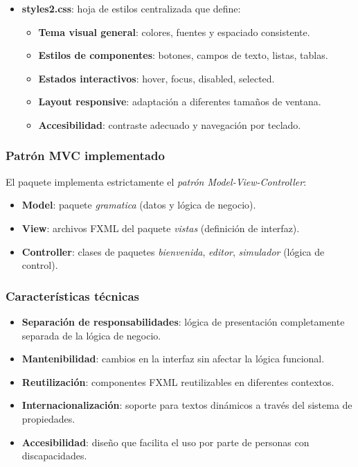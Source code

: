 \begin{itemize}
    \item \textbf{styles2.css}: hoja de estilos centralizada que define:
    \begin{itemize}
        \item \textbf{Tema visual general}: colores, fuentes y espaciado consistente.
        \item \textbf{Estilos de componentes}: botones, campos de texto, listas, tablas.
        \item \textbf{Estados interactivos}: hover, focus, disabled, selected.
        \item \textbf{Layout responsive}: adaptación a diferentes tamaños de ventana.
        \item \textbf{Accesibilidad}: contraste adecuado y navegación por teclado.
    \end{itemize}
\end{itemize}

\subsubsection{Patrón MVC implementado}

El paquete implementa estrictamente el \textit{patrón Model-View-Controller}:

\begin{itemize}
    \item \textbf{Model}: paquete \textit{gramatica} (datos y lógica de negocio).
    \item \textbf{View}: archivos FXML del paquete \textit{vistas} (definición de interfaz).
    \item \textbf{Controller}: clases de paquetes \textit{bienvenida}, \textit{editor}, \textit{simulador} (lógica de control).
\end{itemize}

\subsubsection{Características técnicas}

\begin{itemize}
    \item \textbf{Separación de responsabilidades}: lógica de presentación completamente separada de la lógica de negocio.
    \item \textbf{Mantenibilidad}: cambios en la interfaz sin afectar la lógica funcional.
    \item \textbf{Reutilización}: componentes FXML reutilizables en diferentes contextos.
    \item \textbf{Internacionalización}: soporte para textos dinámicos a través del sistema de propiedades.
    \item \textbf{Accesibilidad}: diseño que facilita el uso por parte de personas con discapacidades.
\end{itemize}

